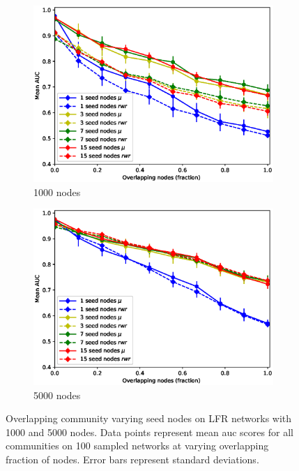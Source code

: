 \documentclass[sigconf]{acmart}
\begin{document}
\begin{figure}[ht]
    \centering
    \begin{subfigure}[b]{0.48\textwidth}
        \centering
        \includegraphics[width=\textwidth]{images/lfr_binary_overlap_auc_1000.eps}
        \caption{1000 nodes}
    \end{subfigure}
    \begin{subfigure}[b]{0.48\textwidth}
        \centering
        \includegraphics[width=\textwidth]{images/lfr_binary_overlap_auc_5000.eps}
        \caption{5000 nodes}
    \end{subfigure}
    \caption{Overlapping community varying seed nodes on LFR networks with 1000 and 5000 nodes.
     Data points represent mean auc scores for all communities on 100 sampled networks at varying overlapping fraction of nodes.
     Error bars represent standard deviations.}
     \label{fig:auc_overlap}
\end{figure}
\end{document}
